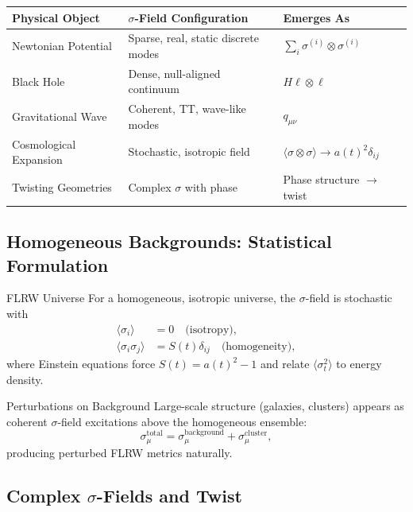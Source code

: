 \documentclass[11pt,a4paper]{article}
\theoremstyle{definition}
\theoremstyle{remark}
\begin{document}
	\begin{center}
		\begin{tabular}{|l|l|l|}
			\hline
			\textbf{Physical Object} & \textbf{$\sigma$-Field Configuration} & \textbf{Emerges As} \\
			\hline
			Newtonian Potential & Sparse, real, static discrete modes & $\sum_i \sigma^{(i)} \otimes \sigma^{(i)}$ \\
			Black Hole & Dense, null-aligned continuum & $H\ell \otimes \ell$ \\
			Gravitational Wave & Coherent, TT, wave-like modes & $q_{\mu\nu}$ \\
			Cosmological Expansion & Stochastic, isotropic field & $\langle\sigma\otimes\sigma\rangle \to a(t)^2 \delta_{ij}$ \\
			Twisting Geometries & Complex $\sigma$ with phase & Phase structure $\to$ twist \\
			\hline
		\end{tabular}
	\end{center}
	
	\subsection{Homogeneous Backgrounds: Statistical Formulation}
	
	FLRW Universe
		For a homogeneous, isotropic universe, the $\sigma$-field is stochastic with
		\begin{align}
			\langle \sigma_i \rangle &= 0 \quad \text{(isotropy)},\\
			\langle \sigma_i \sigma_j \rangle &= S(t) \delta_{ij} \quad \text{(homogeneity)},
		\end{align}
		where Einstein equations force $S(t) = a(t)^2 - 1$ and relate $\langle\sigma_t^2\rangle$ to energy density.
	
	Perturbations on Background
		Large-scale structure (galaxies, clusters) appears as coherent $\sigma$-field excitations above the homogeneous ensemble:
		\begin{equation}
			\sigma_\mu^{\text{total}} = \sigma_\mu^{\text{background}} + \sigma_\mu^{\text{cluster}},
		\end{equation}
		producing perturbed FLRW metrics naturally.
	
	\subsection{Complex $\sigma$-Fields and Twist}
	
\end{document}
